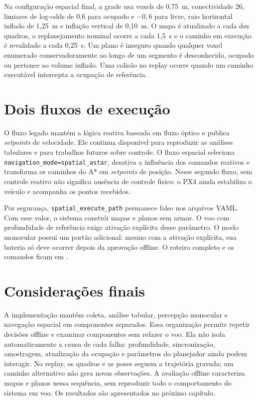 Na configuração espacial final, a grade usa voxels de 0,75~m, conectividade 26, limiares de log-odds de 0,6 para ocupado e $-0,6$ para livre, raio horizontal inflado de 1,25~m e inflação vertical de 0,10~m. O mapa é atualizado a cada dez quadros, o replanejamento nominal ocorre a cada 1,5~s e o caminho em execução é revalidado a cada 0,25~s. Um plano é inseguro quando qualquer voxel enumerado conservadoramente ao longo de um segmento é desconhecido, ocupado ou pertence ao volume inflado. Uma colisão no replay ocorre quando um caminho executável intercepta a ocupação de referência.

\section{Dois fluxos de execução}

O fluxo legado mantém a lógica reativa baseada em fluxo óptico e publica \textit{setpoints} de velocidade. Ele continua disponível para reproduzir as análises tabulares e para trabalhos futuros sobre controle. O fluxo espacial seleciona \texttt{navigation\_mode=spatial\_astar}, desativa a influência dos comandos reativos e transforma os caminhos do A* em \textit{setpoints} de posição. Nesse segundo fluxo, sem controle reativo não significa ausência de controle físico: o PX4 ainda estabiliza o veículo e acompanha os pontos recebidos.

Por segurança, \texttt{spatial\_execute\_path} permanece falso nos arquivos YAML. Com esse valor, o sistema constrói mapas e planos sem armar. O voo com profundidade de referência exige ativação explícita desse parâmetro. O modo monocular possui um portão adicional: mesmo com a ativação explícita, sua bateria só deve ocorrer depois da aprovação offline. O roteiro completo e os comandos ficam em .

\section{Considerações finais}

A implementação mantém coleta, análise tabular, percepção monocular e navegação espacial em componentes separados. Essa organização permite repetir decisões offline e examinar componentes sem refazer o voo. Ela não isola automaticamente a causa de cada falha: profundidade, sincronização, amostragem, atualização da ocupação e parâmetros do planejador ainda podem interagir. No replay, os quadros e as poses seguem a trajetória gravada; um caminho alternativo não gera novas observações. A avaliação offline caracteriza mapas e planos nessa sequência, sem reproduzir todo o comportamento do sistema em voo. Os resultados são apresentados no próximo capítulo.


